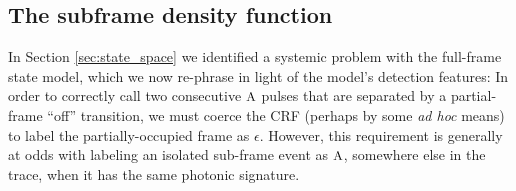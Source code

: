\documentclass[10pt]{article}
\newcommand{\ie}{\emph{i.e.}}
\newcommand{\crf}{{\small CRF}}
\newcommand{\fA}{\ensuremath{\text{\small{A}}}}
\begin{document}

\subsection{The subframe density function}
\label{sec:subframe_photonics}


In Section \ref{sec:state_space} we identified a systemic problem with the full-frame state model, which we now re-phrase in light of the model's detection features:
In order to correctly call two consecutive $\fA$ pulses that are separated by a partial-frame ``off'' transition, we must coerce the \crf{} (perhaps by some \emph{ad hoc} means) to label the partially-occupied frame as $\epsilon$.
However,
this requirement is generally at odds with labeling an isolated sub-frame event as $\fA$, somewhere else in the trace, when it has the same photonic signature.
\end{document}

